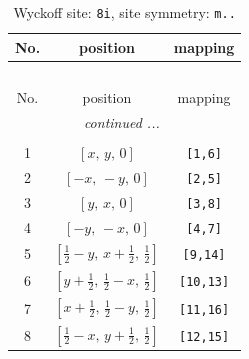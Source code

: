 \documentclass[fleqn,8pt]{jsarticle}
\begin{document}
\renewcommand{\arraystretch}{1.2}
\begin{longtable}{ccc}
\caption{Wyckoff site: {\tt 8i}, site symmetry: {\tt m..}}
 \\
 \hline \hline
No. & position & mapping \\ \hline \endfirsthead

\multicolumn{2}{l}{\tablename\ \thetable{}} \\
 \hline \hline
No. & position & mapping \\ \hline \endhead

 \hline \hline
\multicolumn{2}{r}{\footnotesize\it continued ...} \\ \endfoot

 \hline \hline
\multicolumn{2}{r}{} \\ \endlastfoot

1 & $\left[ x,\, y,\, 0 \right]$ & {\tt [1,6]} \\ \hline
2 & $\left[ - x,\, - y,\, 0 \right]$ & {\tt [2,5]} \\ \hline
3 & $\left[ y,\, x,\, 0 \right]$ & {\tt [3,8]} \\ \hline
4 & $\left[ - y,\, - x,\, 0 \right]$ & {\tt [4,7]} \\ \hline
5 & $\left[ \frac{1}{2} - y,\, x + \frac{1}{2},\, \frac{1}{2} \right]$ & {\tt [9,14]} \\ \hline
6 & $\left[ y + \frac{1}{2},\, \frac{1}{2} - x,\, \frac{1}{2} \right]$ & {\tt [10,13]} \\ \hline
7 & $\left[ x + \frac{1}{2},\, \frac{1}{2} - y,\, \frac{1}{2} \right]$ & {\tt [11,16]} \\ \hline
8 & $\left[ \frac{1}{2} - x,\, y + \frac{1}{2},\, \frac{1}{2} \right]$ & {\tt [12,15]} \\
\end{longtable}
\renewcommand{\arraystretch}{1.2}
\end{document}
